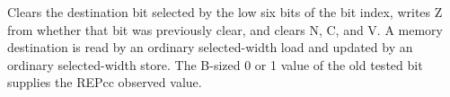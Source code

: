 Clears the destination bit selected by the low six bits of the bit index, writes Z from whether that bit was previously clear, and clears N, C, and V. A memory destination is read by an ordinary selected-width load and updated by an ordinary selected-width store. The B-sized 0 or 1 value of the old tested bit supplies the REPcc observed value.
